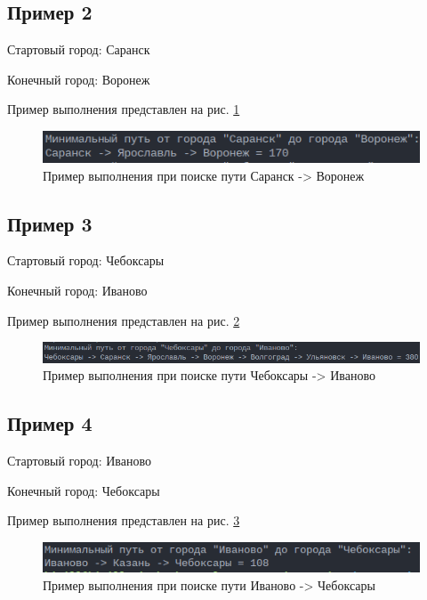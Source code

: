 \subsection*{Пример 2}

Стартовый город: Саранск

Конечный город: Воронеж

Пример выполнения представлен на рис. \ref{fig:example_2}

\begin{figure}[H]
    \centering
    \includegraphics[width=0.7\linewidth]{photo/example_2}
    \caption{Пример выполнения при поиске пути Саранск -> Воронеж}
    \label{fig:example_2}
\end{figure}

\subsection*{Пример 3}

Стартовый город: Чебоксары

Конечный город: Иваново

Пример выполнения представлен на рис. \ref{fig:example_3}

\begin{figure}[H]
    \centering
    \includegraphics[width=0.7\linewidth]{photo/example_3}
    \caption{Пример выполнения при поиске пути Чебоксары -> Иваново}
    \label{fig:example_3}
\end{figure}

\subsection*{Пример 4}

Стартовый город: Иваново

Конечный город: Чебоксары

Пример выполнения представлен на рис. \ref{fig:example_4}

\begin{figure}[H]
    \centering
    \includegraphics[width=0.7\linewidth]{photo/example_4}
    \caption{Пример выполнения при поиске пути Иваново -> Чебоксары}
    \label{fig:example_4}
\end{figure}